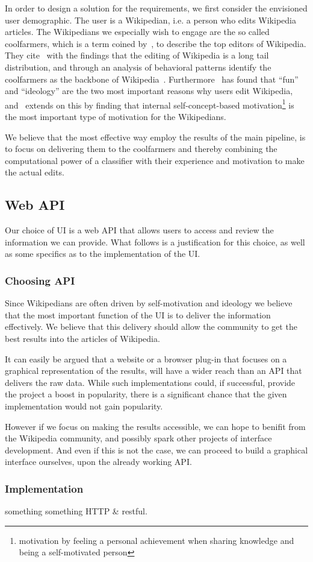 In order to design a solution for the requirements, we first consider the envisioned user demographic. The user is a Wikipedian, i.e. a person who edits Wikipedia articles. The Wikipedians we especially wish to engage are the so called coolfarmers, which is a term coined by~\cite{coolfarming}, to describe the top editors of Wikipedia. They cite~\cite{Priedhorsky:2007:CDR:1316624.1316663} with the findings that the editing of Wikipedia is a long tail distribution, and through an analysis of behavioral patterns identify the coolfarmers as the backbone of Wikipedia~\cite{coolfarming}. Furthermore~\cite{wiki_motivation} has found that \enquote{fun} and \enquote{ideology} are the two most important reasons why users edit Wikipedia, and~\cite{Yang20101377} extends on this by finding that internal self-concept-based motivation\footnote{motivation by feeling a personal achievement when sharing knowledge and being a self-motivated person} is the most important type of motivation for the Wikipedians.

We believe that the most effective way employ the results of the main pipeline, is to focus on delivering them to the coolfarmers and thereby combining the computational power of a classifier with their experience and motivation to make the actual edits.


\subsection{Web API}

Our choice of UI is a web API that allows users to access and review the information we can provide. What follows is a justification for this choice, as well as some specifics as to the implementation of the UI.

\subsubsection{Choosing API}
Since Wikipedians are often driven by self-motivation and ideology we believe that the most important function of the UI is to deliver the information effectively. We believe that this delivery should allow the community to get the best results into the articles of Wikipedia.

It can easily be argued that a website or a browser plug-in that focuses on a graphical representation of the results, will have a wider reach than an API that delivers the raw data. While such implementations could, if successful, provide the project a boost in popularity, there is a significant chance that the given implementation would not gain popularity.

However if we focus on making the results accessible, we can hope to benifit from the Wikipedia community, and possibly spark other projects of interface development. And even if this is not the case, we can proceed to build a graphical interface ourselves, upon the already working API.

\subsubsection{Implementation}

something something HTTP \& restful.